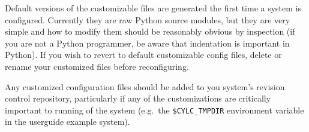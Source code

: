 Default versions of the customizable files are generated the first time
a system is configured. Currently they are raw Python source modules,
but they are very simple and how to modify them should be reasonably
obvious by inspection (if you are not a Python programmer, be aware that
indentation is important in Python).  If you wish to revert to default
customizable config files, delete or rename your customized files before
reconfiguring.

Any customized configuration files should be added to you system's
revision control repository, particularly if any of the customizations
are critically important to running of the system (e.g.\ the
\lstinline=$CYLC_TMPDIR= environment variable in the userguide example
system).
